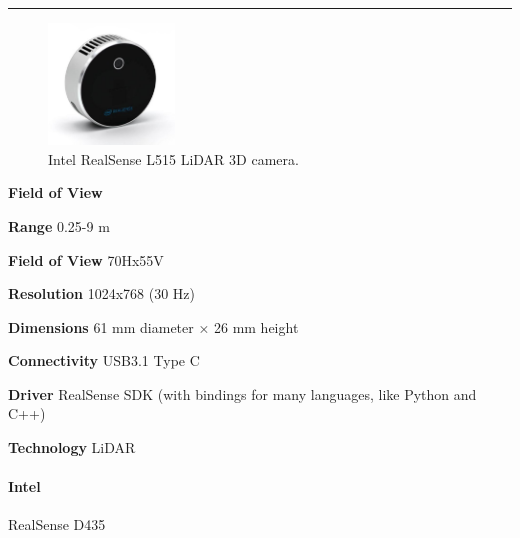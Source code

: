 \documentclass[../main.tex]{subfiles}
\begin{document}
\noindent\rule{8cm}{0.1pt}
\begin{figure}[H]
    \centering
    \includegraphics[width=0.3\textwidth]{images/realsenseL515.jpg}
    \caption{Intel RealSense L515 LiDAR 3D camera.}
    \label{fig:realsenseL515}
\end{figure}
\begin{labeling}{\textbf{Field of View    }}
    \setlength{\itemindent}{2em}
    \item [\textbf{Range}] 0.25-9 m
    \item [\textbf{Field of View}] 70Hx55V
    \item [\textbf{Resolution}] 1024x768 (30 Hz)
    \item [\textbf{Dimensions}] 61 mm diameter × 26 mm height
    \item [\textbf{Connectivity}] USB3.1 Type C
    \item [\textbf{Driver}] RealSense SDK (with bindings for many languages, like Python and C++)
    \item [\textbf{Technology}] LiDAR
\end{labeling}
\vspace{1em}
\paragraph{\large \textbf{Intel}} {\large RealSense D435}
\end{document}
